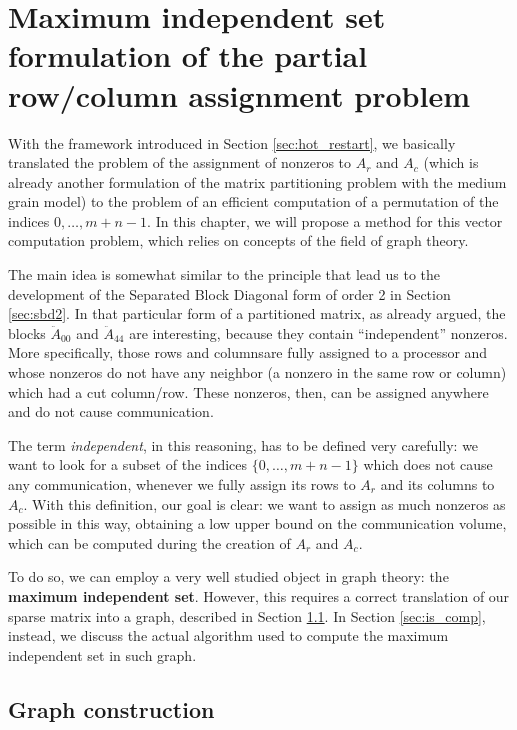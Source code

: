 \chapter{Maximum independent set formulation of the partial row/column assignment problem} \label{chap:independent_set}

With the framework introduced in Section \ref{sec:hot_restart}, we basically translated the problem of the assignment of nonzeros to $A_r$ and $A_c$ (which is already another formulation of the matrix partitioning problem with the medium grain model) to the problem of an efficient computation of a permutation of the indices $0,\dots,m+n-1$. In this chapter, we will propose a method for this vector computation problem, which relies on concepts of the field of graph theory.

The main idea is somewhat similar to the principle that lead us to the development of the Separated Block Diagonal form of order 2 in Section \ref{sec:sbd2}. In that particular form of a partitioned matrix, as already argued, the blocks $\ddot{A}_{00}$ and $\ddot{A}_{44}$ are interesting, because they contain ``independent'' nonzeros. More specifically, those rows and columnsare fully assigned to a processor and whose nonzeros do not have any neighbor (a nonzero in the same row or column) which had a cut column/row. These nonzeros, then, can be assigned anywhere and do not cause communication.

The term \emph{independent}, in this reasoning, has to be defined very carefully: we want to look for a subset of the indices $\{0,\dots,m+n-1\}$ which does not cause any communication, whenever we fully assign its rows to $A_r$ and its columns to $A_c$. With this definition, our goal is clear: we want to assign as much nonzeros as possible in this way, obtaining a low upper bound on the communication volume, which can be computed during the creation of $A_r$ and $A_c$.

To do so, we can employ a very well studied object in graph theory: the \textbf{maximum independent set}. However, this requires a correct translation of our sparse matrix into a graph, described in Section \ref{sec:is_graph}. In Section \ref{sec:is_comp}, instead, we discuss the actual algorithm used to compute the maximum independent set in such graph.

\section{Graph construction} \label{sec:is_graph}

